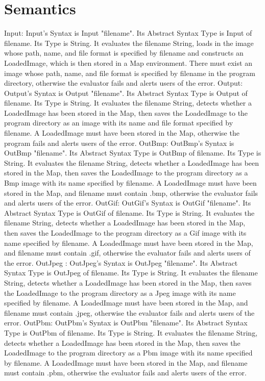 \documentclass{article}
\begin{document}
\section{Semantics}

Input: Input's Syntax is Input "filename". Its Abstract Syntax Type is Input of filename. Its Type is String. It evaluates the filename String, loads in the image whose path, name, and file format is specified by filename and constructs an LoadedImage, which is then stored in a Map environment. There must exist an image whose path, name, and file format is specified by filename in the program directory, otherwise the evaluator fails and alerts users of the error.
\vskip 0.2in
Output: Output's Syntax is Output "filename". Its Abstract Syntax Type is Output of filename. Its Type is String. It evaluates the filename String, detects whether a LoadedImage has been stored in the Map, then saves the LoadedImage to the program directory as an image with its name and file format specified by filename. A LoadedImage must have been stored in the Map, otherwise the program fails and alerts users of the error.
\vskip 0.2in
OutBmp: OutBmp's Syntax is OutBmp "filename". Its Abstract Syntax Type is OutBmp of filename. Its Type is String. It evaluates the filename String, detects whether a LoadedImage has been stored in the Map, then saves the LoadedImage to the program directory as a Bmp image with its name specified by filename. A LoadedImage must have been stored in the Map, and filename must contain .bmp, otherwise the evaluator fails and alerts users of the error.
\vskip 0.2in
OutGif: OutGif's Syntax is OutGif "filename". Its Abstract Syntax Type is OutGif of filename. Its Type is String. It evaluates the filename String, detects whether a LoadedImage has been stored in the Map, then saves the LoadedImage to the program directory as a Gif image with its name specified by filename. A LoadedImage must have been stored in the Map, and filename must contain .gif, otherwise the evaluator fails and alerts users of the error.
\vskip 0.2in
OutJpeg : OutJpeg's Syntax is OutJpeg "filename". Its Abstract Syntax Type is OutJpeg of filename. Its Type is String. It evaluates the filename String, detects whether a LoadedImage has been stored in the Map, then saves the LoadedImage to the program directory as a Jpeg image with its name specified by filename. A LoadedImage must have been stored in the Map, and filename must contain .jpeg, otherwise the evaluator fails and alerts users of the error.
\vskip 0.2in
OutPbm: OutPbm's Syntax is OutPbm "filename". Its Abstract Syntax Type is OutPbm of filename. Its Type is String. It evaluates the filename String, detects whether a LoadedImage has been stored in the Map, then saves the LoadedImage to the program directory as a Pbm image with its name specified by filename. A LoadedImage must have been stored in the Map, and filename must contain .pbm, otherwise the evaluator fails and alerts users of the error.
\end{document}
